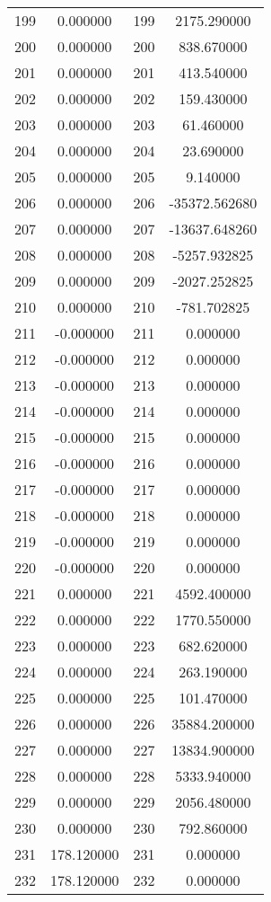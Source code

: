 \documentclass[12pt]{article}
\begin{document}
\begin{longtable}{@{}cccc@{}}
199 & 0.000000 & 199 & 2175.290000 \\
200 & 0.000000 & 200 & 838.670000 \\
201 & 0.000000 & 201 & 413.540000 \\
202 & 0.000000 & 202 & 159.430000 \\
203 & 0.000000 & 203 & 61.460000 \\
204 & 0.000000 & 204 & 23.690000 \\
205 & 0.000000 & 205 & 9.140000 \\
206 & 0.000000 & 206 & -35372.562680 \\
207 & 0.000000 & 207 & -13637.648260 \\
208 & 0.000000 & 208 & -5257.932825 \\
209 & 0.000000 & 209 & -2027.252825 \\
210 & 0.000000 & 210 & -781.702825 \\
211 & -0.000000 & 211 & 0.000000 \\
212 & -0.000000 & 212 & 0.000000 \\
213 & -0.000000 & 213 & 0.000000 \\
214 & -0.000000 & 214 & 0.000000 \\
215 & -0.000000 & 215 & 0.000000 \\
216 & -0.000000 & 216 & 0.000000 \\
217 & -0.000000 & 217 & 0.000000 \\
218 & -0.000000 & 218 & 0.000000 \\
219 & -0.000000 & 219 & 0.000000 \\
220 & -0.000000 & 220 & 0.000000 \\
221 & 0.000000 & 221 & 4592.400000 \\
222 & 0.000000 & 222 & 1770.550000 \\
223 & 0.000000 & 223 & 682.620000 \\
224 & 0.000000 & 224 & 263.190000 \\
225 & 0.000000 & 225 & 101.470000 \\
226 & 0.000000 & 226 & 35884.200000 \\
227 & 0.000000 & 227 & 13834.900000 \\
228 & 0.000000 & 228 & 5333.940000 \\
229 & 0.000000 & 229 & 2056.480000 \\
230 & 0.000000 & 230 & 792.860000 \\
231 & 178.120000 & 231 & 0.000000 \\
232 & 178.120000 & 232 & 0.000000 \\

\end{longtable}
\end{document}

